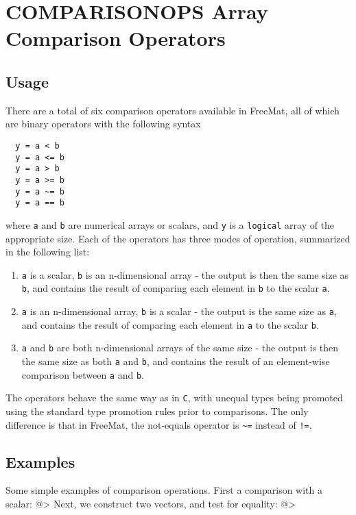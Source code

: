 \section{COMPARISONOPS Array Comparison Operators}

\subsection{Usage}

There are a total of six comparison operators available in FreeMat, all of which are binary operators with the following syntax
\begin{verbatim}
  y = a < b
  y = a <= b
  y = a > b
  y = a >= b
  y = a ~= b
  y = a == b
\end{verbatim}
where \verb|a| and \verb|b| are numerical arrays or scalars, and \verb|y| is a \verb|logical| array of the appropriate size.  Each of the operators has three modes of operation, summarized in the following list:
\begin{enumerate}
\item  \verb|a| is a scalar, \verb|b| is an n-dimensional array - the output is then the same size as \verb|b|, and contains the result of comparing each element in \verb|b| to the scalar \verb|a|.

\item  \verb|a| is an n-dimensional array, \verb|b| is a scalar - the output is the same size as \verb|a|, and contains the result of comparing each element in \verb|a| to the scalar \verb|b|.

\item  \verb|a| and \verb|b| are both n-dimensional arrays of the same size - the output is then the same size as both \verb|a| and \verb|b|, and contains the result of an element-wise comparison between \verb|a| and \verb|b|.

\end{enumerate}
The operators behave the same way as in \verb|C|, with unequal types being promoted using the standard type promotion rules prior to comparisons.  The only difference is that in FreeMat, the not-equals operator is \verb|~=| instead of \verb|!=|.
\subsection{Examples}

Some simple examples of comparison operations.  First a comparison with a scalar:
@>
Next, we construct two vectors, and test for equality:
@>
